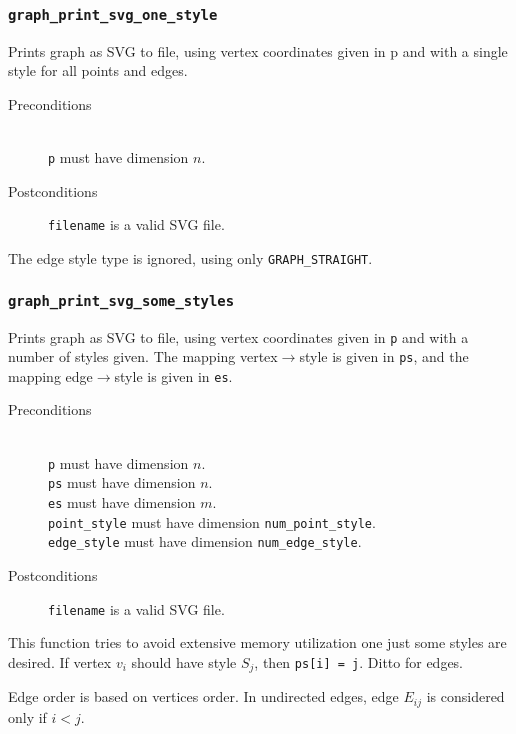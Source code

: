 \documentclass[a4paper,10pt]{article}
\begin{document}
\subsubsection{\texttt{graph\_print\_svg\_one\_style}}

Prints graph as SVG to file, using vertex coordinates given in p and with a 
single style for all points and edges.

\begin{description}
 \item[Preconditions]~\\
   \texttt{p} must have dimension $n$.
 \item[Postconditions]
   \texttt{filename} is a valid SVG file.
\end{description}

The edge style type is ignored, using only \texttt{GRAPH\_STRAIGHT}.

\subsubsection{\texttt{graph\_print\_svg\_some\_styles}}

Prints graph as SVG to file, using vertex coordinates given in \texttt{p} and
with a number of styles given. The mapping vertex$\to$style is given in \texttt{ps},
and the mapping edge$\to$style is given in \texttt{es}.

\begin{description}
 \item[Preconditions]~\\
   \texttt{p} must have dimension $n$.\\
   \texttt{ps} must have dimension $n$.\\
   \texttt{es} must have dimension $m$.\\
   \texttt{point\_style} must have dimension \texttt{num\_point\_style}.\\
   \texttt{edge\_style} must have dimension \texttt{num\_edge\_style}.
 \item[Postconditions]
   \texttt{filename} is a valid SVG file.
\end{description}

This function tries to avoid extensive memory utilization one just some 
styles are desired. If vertex $v_i$ should have style $S_j$, then 
\texttt{ps[i] = j}. Ditto for edges.

Edge order is based on vertices order. In undirected edges, edge $E_{ij}$ 
is considered only if $i < j$.
\end{document}
